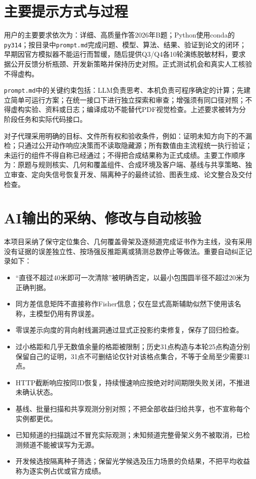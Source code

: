 \documentclass[UTF8,fontset=fandol,a4paper,zihao=-4]{ctexart}
\begin{document}
\section{主要提示方式与过程}
用户的主要要求依次为：详细、高质量作答2026年B题；Python使用conda的\texttt{py314}；按目录中\texttt{prompt.md}完成问题、模型、算法、结果、验证到论文的闭环；早期因官方模拟器不能运行而暂缓，随后提供Q3/Q4各10轮演练脱敏材料，要求据公开反馈分析瓶颈、开发新策略并保持历史对照。正式测试机会和真实人工核验不得虚构。

\texttt{prompt.md}中的关键约束包括：LLM负责思考、本机负责可程序确定的计算；先建立简单可运行方案；在统一接口下进行独立探索和审查；增强须有同口径对照；不得虚构实验、资料或日志；编译成功不能替代PDF视觉检查。上述要求被转为分阶段任务和实际代码接口。

对子代理采用明确的目标、文件所有权和验收条件，例如：证明未知方向下的不漏检；只通过公开动作响应决策而不读取隐藏源；所有数值由主流程统一执行验证；未运行的组件不得自称已经通过；不得把合成结果称为正式成绩。主要工作顺序为：原题与规则核实、几何和覆盖组件、合成环境及客户端、基线与共享策略、独立审查、定向失信号恢复开发、隔离种子的最终试验、图表生成、论文整合及交付检查。

\section{AI输出的采纳、修改与自动核验}
本项目采纳了保守定位集合、几何覆盖骨架及逐频道完成证书作为主线，没有采用没有证据的误差独立性、按场强反推距离或猜测总数停止等做法。重要自动纠正记录如下：
\begin{itemize}
\item “直径不超过40米即可一次清除”被明确否定，以最小包围圆半径不超过20米为正确判据。
\item 同方差信息矩阵不直接称作Fisher信息；仅在显式高斯辅助似然下使用该名称，主模型仍用有界误差。
\item 零误差示向度的背向射线漏洞通过显式正投影约束修复，保存了回归检查。
\item 过小格距和几乎无数值余量的格距被限制；历史31点构造与本轮25点构造分别保留自己的证明，31点不可删结论仅针对该格点集合，不等于全局至少需要31点。
\item HTTP截断响应按同ID恢复，持续慢速响应按绝对时间期限失败关闭，不推进未确认状态。
\item 基线、批量扫描和共享观测分别对照；不把全部收益归给共享，也不宣称每个实例都更优。
\item 已知频道的扫描跳过不冒充实际观测；未知频道完整骨架义务不被取消，已检测频道不能被误写为无源。
\item 开发候选按隔离种子筛选；保留光学候选及压力场景的负结果，不把平均收益称为逐实例占优或官方成绩。
\end{itemize}
\end{document}
